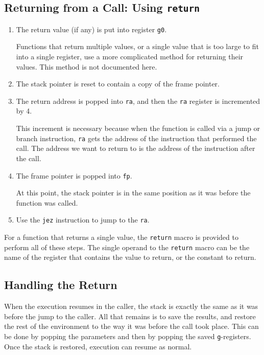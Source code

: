 \subsection{Returning from a Call: Using {\tt return}}
\label{reg32-return-sec}

\begin{enumerate}

\item The return value (if any) is put into register {\tt g0}.

	Functions that return multiple values, or a single value that
	is too large to fit into a single register, use a more
	complicated method for returning their values.  This method is
	not documented here.

\item The stack pointer is reset to contain a copy of the frame
	pointer.

\item The return address is popped into {\tt ra}, and then
	the {\tt ra} register is incremented by 4.

	This increment is necessary because when the function is
	called via a jump or branch instruction, {\tt ra} gets the
	address of the instruction that performed the call.  The
	address we want to return to is the address of the instruction
	after the call.

\item The frame pointer is popped into {\tt fp}.

	At this point, the stack pointer is in the same position as it
	was before the function was called.

\item Use the {\tt jez} instruction to jump to the {\tt ra}.

\end{enumerate}

For a function that returns a single value, the {\tt return} macro is
provided to perform all of these steps.  The single operand to the
{\tt return} macro can be the name of the register that contains the value
to return, or the constant to return.

\subsection{Handling the Return}

When the execution resumes in the caller, the stack is exactly the
same as it was before the jump to the caller.  All that remains is to
save the results, and restore the rest of the environment to the way
it was before the call took place.  This can be done by popping the
parameters and then by popping the saved {\tt g}-registers.  Once the
stack is restored, execution can resume as normal.

